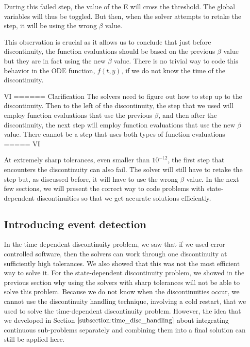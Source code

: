 During this failed step, the value of the E will cross the threshold. The global variables will thus be toggled. But then, when the solver attempts to retake the step, it will be using the wrong $\beta$ value. 

This observation is crucial as it allows us to conclude that just before discontinuity, the function evaluations should be based on the previous $\beta$ value but they are in fact using the new $\beta$ value. There is no trivial way to code this behavior in the ODE function, $f(t, y)$, if we do not know the time of the discontinuity. 

VI ====== Clarification
The solvers need to figure out how to step up to the discontinuity. Then to the left of the discontinuity, the step that we used will employ function evaluations that use the previous $\beta$, and then after the discontinuity, the next step will employ function evaluations that use the new $\beta$ value. There cannot be a step that uses both types of function evaluations
===== VI

At extremely sharp tolerances, even smaller than $10^{-12}$, the first step that encounters the discontinuity can also fail. The solver will still have to retake the step but, as discussed before, it will have to use the wrong $\beta$ value. In the next few sections, we will present the correct way to code problems with state-dependent discontinuities so that we get accurate solutions efficiently.

\subsection{Introducing event detection}
\label{subsection:intro_event_detection}
In the time-dependent discontinuity problem, we saw that if we used error-controlled software, then the solvers can work through one discontinuity at sufficiently high tolerances. We also showed that this was not the most efficient way to solve it. For the state-dependent discontinuity problem, we showed in the previous section why using the solvers with sharp tolerances will not be able to solve this problem. Because we do not know when the discontinuities occur, we cannot use the discontinuity handling technique, involving a cold restart, that we used to solve the time-dependent discontinuity problem. However, the idea that we developed in Section $\ref{subsection:time_disc_handling}$ about integrating continuous sub-problems separately and combining them into a final solution can still be applied here. 

